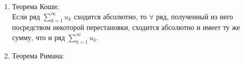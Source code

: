\documentclass[oneside,final,12pt]{extreport}
\begin{document}
\begin{enumerate}
    \item Теорема Коши: \\
    Если ряд \( \sum\limits_{k=1}^\infty u_k\) сходится абсолютно, то \( \forall \) ряд, полученный из него посредством некоторой перестановки, сходится абсолютно и имеет ту же сумму, что и ряд \( \sum\limits_{k=1}^\infty u_k\).
    
    \item Теорема Римана: \\
    
    
    
\end{enumerate}
\end{document}
